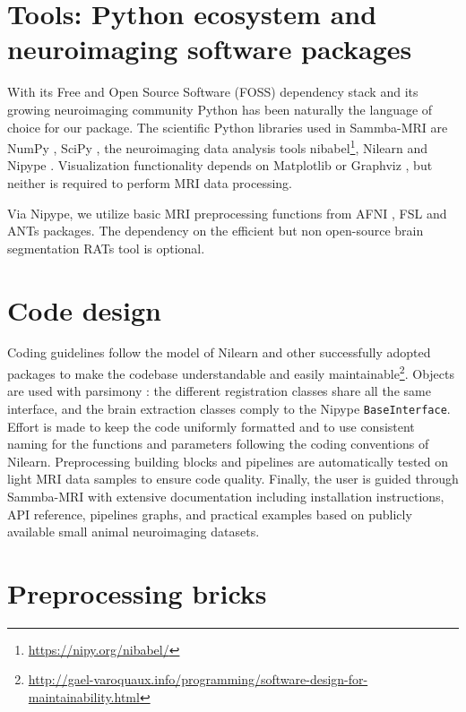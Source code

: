 \documentclass[utf8, a4paper, final, crop]{frontiersSCNS}
\newcommand{\pythoninline}[1]{\texttt{#1}}
\begin{document}
\section{Tools: Python ecosystem and neuroimaging software packages}

With its Free and Open Source Software (FOSS)
dependency stack and its growing neuroimaging community 
Python has been naturally the language of choice for our
package.
The scientific Python libraries used in Sammba-MRI are
NumPy \citep{oliphant2006guide}, SciPy \citep{millman2011python}, the neuroimaging 
data analysis tools nibabel\footnote{\url{https://nipy.org/nibabel/}}, Nilearn \citep{abraham2014machine} and 
Nipype \citep{gorgolewski2011Nipype}.
Visualization functionality depends on Matplotlib \citep{hunter2007matplotlib} 
or Graphviz \citep{gansner2000open}, but neither is required to perform
MRI data processing.

Via Nipype, we utilize basic MRI preprocessing
functions from AFNI \citep{cox1996afni}, FSL \citep{jenkinson2012fsl} and ANTs 
\citep{avants2009advanced}
packages. The dependency on the efficient but non open-source brain segmentation RATs 
tool \citep{oguz2014rats} is optional.

\section{Code design}

Coding guidelines follow the
model of Nilearn and other successfully adopted packages
\citep[e.g. Scikit-learn][]{pedregosa2011scikit} 
to make the codebase understandable and easily maintainable\footnote{\url{http://gael-varoquaux.info/programming/software-design-for-maintainability.html}}.
Objects are used with parsimony : the different registration classes share
all the same interface, and the brain extraction
classes comply to the Nipype \pythoninline{BaseInterface}.
Effort is made to keep the code uniformly formatted and to use consistent 
naming for the functions and parameters 
following the coding conventions of Nilearn.
Preprocessing building blocks and pipelines are automatically tested on light MRI 
data samples to ensure code quality.
Finally, the user is guided through Sammba-MRI with 
extensive documentation including installation instructions, API reference,
pipelines graphs, and practical examples based on publicly available small animal 
neuroimaging datasets.

\section{Preprocessing bricks}
\end{document}
